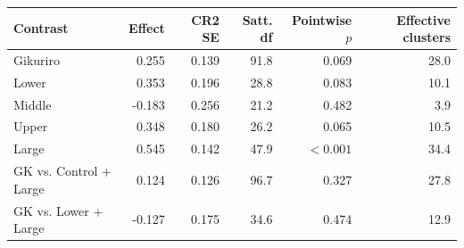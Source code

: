 \begin{tabular}{lrrrrr}
\toprule
Contrast & Effect & CR2 SE & Satt. df & Pointwise $p$ & Effective clusters \\
\midrule
Gikuriro & 0.255 & 0.139 & 91.8 & 0.069 & 28.0 \\
Lower & 0.353 & 0.196 & 28.8 & 0.083 & 10.1 \\
Middle & -0.183 & 0.256 & 21.2 & 0.482 & 3.9 \\
Upper & 0.348 & 0.180 & 26.2 & 0.065 & 10.5 \\
Large & 0.545 & 0.142 & 47.9 & $<0.001$ & 34.4 \\
GK vs. Control + Large & 0.124 & 0.126 & 96.7 & 0.327 & 27.8 \\
GK vs. Lower + Large & -0.127 & 0.175 & 34.6 & 0.474 & 12.9 \\
\bottomrule
\end{tabular}
